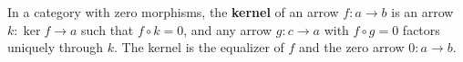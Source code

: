 In a category with zero morphisms, the \textbf{kernel} of an arrow $f: a \rightarrow b$ is an arrow $k: \ker f \rightarrow a$ such that $f \circ k = 0$, and any arrow $g: c \rightarrow a$ with $f \circ g = 0$ factors uniquely through $k$. The kernel is the equalizer of $f$ and the zero arrow $0: a \rightarrow b$.